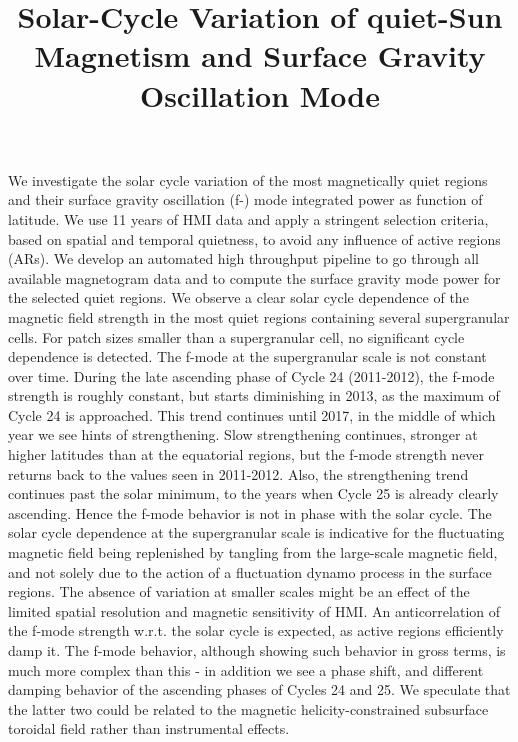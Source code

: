 \documentclass{aa}
\begin{document}
\title{Solar-Cycle Variation of quiet-Sun Magnetism and Surface Gravity Oscillation Mode}



{We investigate the solar cycle variation of the most magnetically quiet regions and
their surface gravity oscillation (f-) mode integrated power as function of latitude.}
{We use 11 years of HMI data and apply a stringent selection criteria, based on
spatial and temporal quietness, to avoid any influence of active regions (ARs).
We develop an automated high throughput pipeline to go through all available magnetogram data
and to compute the surface gravity mode power for the selected quiet regions.}
{We observe a clear solar cycle dependence of the magnetic field strength in the most
quiet regions containing several supergranular cells. For patch sizes smaller than a supergranular
cell, no significant cycle dependence is detected. The f-mode at the supergranular scale 
is not constant over time.
During the late ascending phase of Cycle 24 (2011-2012), the f-mode strength is roughly constant, but starts diminishing in 2013, as the maximum of Cycle 24 is approached. This trend continues
until 2017, in the middle of which year we see hints of strengthening.
Slow strengthening continues, stronger at higher latitudes than at the equatorial regions, but the f-mode strength never returns back to the values seen in 2011-2012. Also, the strengthening trend continues past the solar minimum, to the years when Cycle 25 is already clearly ascending. Hence the f-mode behavior is not in phase with the solar cycle. 
}
{The solar cycle dependence at the supergranular scale is indicative for the fluctuating magnetic
field being replenished by tangling from the large-scale magnetic field, and not solely due to
the action of a fluctuation dynamo process in the surface regions. 
The absence of variation at smaller scales might be an effect of the
limited spatial resolution and magnetic sensitivity of HMI.
An anticorrelation of the f-mode strength w.r.t. the solar cycle is expected, as active regions efficiently damp it. The f-mode behavior, although showing such behavior in gross terms, is much more complex than this - in addition we see a phase shift, and different damping behavior of the ascending phases of Cycles 24 and 25. We speculate that the latter two could be related to the magnetic helicity-constrained subsurface toroidal field rather than instrumental effects.
}
\end{document}
